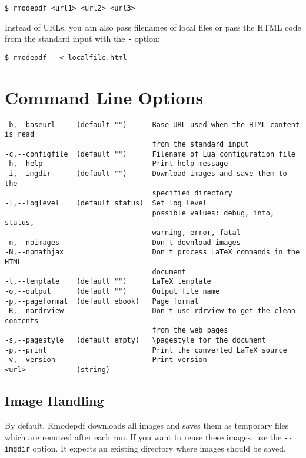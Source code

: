 \documentclass{article}
\begin{document}
\begin{verbatim}
$ rmodepdf <url1> <url2> <url3>
\end{verbatim}

Instead of URLs, you can also pass filenames of local files or pass the HTML code from the 
standard input with the \verb|-| option:

\begin{verbatim}
$ rmodepdf - < localfile.html
\end{verbatim}





\section{Command Line Options}


\begin{verbatim}
-b,--baseurl     (default "")      Base URL used when the HTML content is read
                                   from the standard input
-c,--configfile  (default "")      Filename of Lua configuration file
-h,--help                          Print help message
-i,--imgdir      (default "")      Download images and save them to the
                                   specified directory
-l,--loglevel    (default status)  Set log level
                                   possible values: debug, info, status,
                                   warning, error, fatal
-n,--noimages                      Don't download images
-N,--nomathjax                     Don't process LaTeX commands in the HTML
                                   document
-t,--template    (default "")      LaTeX template
-o,--output      (default "")      Output file name
-p,--pageformat  (default ebook)   Page format 
-R,--nordrview                     Don't use rdrview to get the clean contents
                                   from the web pages
-s,--pagestyle   (default empty)   \pagestyle for the document
-p,--print                         Print the converted LaTeX source
-v,--version                       Print version
<url>            (string)
\end{verbatim}



\subsection{Image Handling}

By default, Rmodepdf downloads all images and saves them as temporary files which are removed
after each run. If you want to reuse these images, use the \verb|--imgdir| option. It expects
an existing directory where images should be saved.
\end{document}
